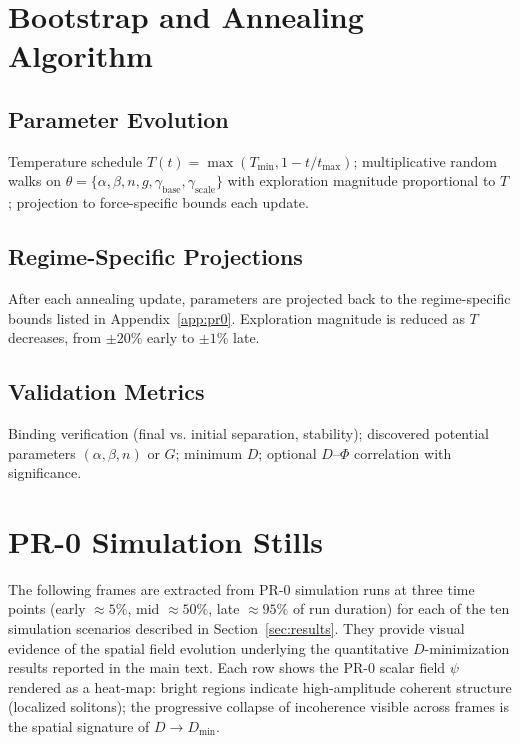 \documentclass[12pt]{article}
\begin{document}
\section{Bootstrap and Annealing Algorithm}\label{app:bootstrap}
\subsection{Parameter Evolution}
Temperature schedule $T(t)=\max(T_{\min},1-t/t_{\max})$; multiplicative random walks on $\theta=\{\alpha,\beta,n,g,\gamma_{\mathrm{base}},\gamma_{\mathrm{scale}}\}$ with exploration magnitude proportional to $T$; projection to force-specific bounds each update.
\subsection{Regime-Specific Projections}
After each annealing update, parameters are projected back to the regime-specific bounds listed in Appendix~\ref{app:pr0}. Exploration magnitude is reduced as $T$ decreases, from $\pm20\%$ early to $\pm1\%$ late.
\subsection{Validation Metrics}
Binding verification (final vs. initial separation, stability); discovered potential parameters $(\alpha,\beta,n)$ or $G$; minimum $D$; optional $D$--$\Phi$ correlation with significance.

\section{PR-0 Simulation Stills}\label{app:sim-stills}

The following frames are extracted from PR-0 simulation runs at three time
points (early $\approx5\%$, mid $\approx50\%$, late $\approx95\%$ of run
duration) for each of the ten simulation scenarios described in
Section~\ref{sec:results}.  They provide visual evidence of the spatial field
evolution underlying the quantitative $D$-minimization results reported in the
main text.  Each row shows the PR-0 scalar field $\psi$ rendered as a
heat-map: bright regions indicate high-amplitude coherent structure
(localized solitons); the progressive collapse of incoherence visible across
frames is the spatial signature of $D \to D_{\min}$.

\end{document}
